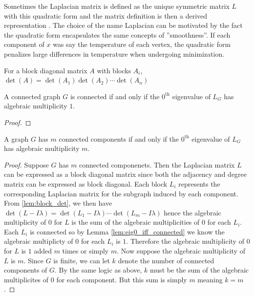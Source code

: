 \documentclass[11pt]{article}
\begin{document}
\begin{remark}
    Sometimes the Laplacian matrix is defined as the unique symmetric matrix $L$ with this quadratic form and the matrix definition is then a derived representation \cite{WATKINS199443}. The choice of the name Laplacian can be motivated by the fact the quadratic form encapsulates the same concepts of ''smoothness''. If each component of $x$ was say the temperature of each vertex, the quadratic form penalizes large differences in temperature when undergoing minimization.
\end{remark}

\begin{lemma}
    \label{lem:block_det}
    For a block diagonal matrix $A$ with blocks $A_i$, $\det(A) = \det(A_1) \det(A_2) \cdots \det(A_n)$
\end{lemma}

\begin{lemma}
    \label{lem:eig0_iff_connected}
    A connected graph $G$ is connected if and only if the $0^\text{th}$ eigenvalue of $L_G$ has algebraic multiplicity $1$.
\end{lemma}
\begin{proof}
\end{proof}

\begin{theorem}
    A graph $G$ has $m$ connected components if and only if the $0^\text{th}$ eigenvalue of $L_G$ has algebraic multiplicity $m$.
\end{theorem}

\begin{proof}
    Suppose $G$ has $m$ connected componenets. Then the Laplacian matrix $L$ can be expressed as a block diagonal matrix since both the adjacency and degree matrix can be expressed as block diagonal. Each block $L_i$ represents the corresponding Laplacian matrix for the subgraph induced by each component. From \ref{lem:block_det}, we then have $\det(L - I \lambda) = \det(L_1 - I \lambda) \cdots \det(L_m - I \lambda)$ hence the algebraic multiplicity of $0$ for $L$ is the sum of the algebraic multiplicities of $0$ for each $L_i$. Each $L_i$ is connected so by Lemma \ref{lem:eig0_iff_connected} we know the algebraic multiplicty of $0$ for each $L_i$ is $1$. Therefore the algebraic multiplicity of $0$ for $L$ is $1$ added $m$ times or simply $m$. Now suppose the algebraic multiplicity of $L$ is $m$. Since $G$ is finite, we can let $k$ denote the number of connected components of $G$. By the same logic as above, $k$ must be the sum of the algebraic multiplicites of $0$ for each component. But this sum is simply $m$ meaning $k = m$.
\end{proof}
\end{document}
